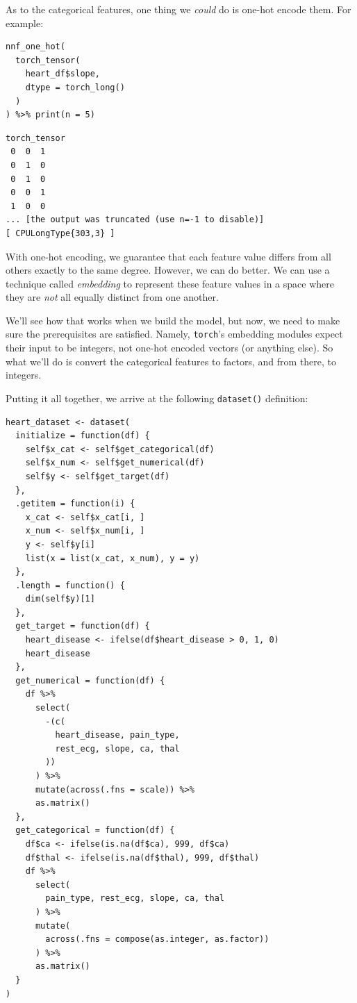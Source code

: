 \documentclass[
  letterpaper,
]{krantz}
\begin{document}
As to the categorical features, one thing we \emph{could} do is one-hot
encode them. For example:

\begin{verbatim}
nnf_one_hot(
  torch_tensor(
    heart_df$slope,
    dtype = torch_long()
  )
) %>% print(n = 5)
\end{verbatim}

\begin{verbatim}
torch_tensor
 0  0  1
 0  1  0
 0  1  0
 0  0  1
 1  0  0
... [the output was truncated (use n=-1 to disable)]
[ CPULongType{303,3} ]
\end{verbatim}

With one-hot encoding, we guarantee that each feature value differs from
all others exactly to the same degree. However, we can do better. We can
use a technique called \emph{embedding} to represent these feature
values in a space where they are \emph{not} all equally distinct from
one another.

We'll see how that works when we build the model, but now, we need to
make sure the prerequisites are satisfied. Namely, \texttt{torch}'s
embedding modules expect their input to be integers, not one-hot encoded
vectors (or anything else). So what we'll do is convert the categorical
features to factors, and from there, to integers.

Putting it all together, we arrive at the following \texttt{dataset()}
definition:

\begin{verbatim}
heart_dataset <- dataset(
  initialize = function(df) {
    self$x_cat <- self$get_categorical(df)
    self$x_num <- self$get_numerical(df)
    self$y <- self$get_target(df)
  },
  .getitem = function(i) {
    x_cat <- self$x_cat[i, ]
    x_num <- self$x_num[i, ]
    y <- self$y[i]
    list(x = list(x_cat, x_num), y = y)
  },
  .length = function() {
    dim(self$y)[1]
  },
  get_target = function(df) {
    heart_disease <- ifelse(df$heart_disease > 0, 1, 0)
    heart_disease
  },
  get_numerical = function(df) {
    df %>%
      select(
        -(c(
          heart_disease, pain_type,
          rest_ecg, slope, ca, thal
        ))
      ) %>%
      mutate(across(.fns = scale)) %>%
      as.matrix()
  },
  get_categorical = function(df) {
    df$ca <- ifelse(is.na(df$ca), 999, df$ca)
    df$thal <- ifelse(is.na(df$thal), 999, df$thal)
    df %>%
      select(
        pain_type, rest_ecg, slope, ca, thal
      ) %>%
      mutate(
        across(.fns = compose(as.integer, as.factor))
      ) %>%
      as.matrix()
  }
)
\end{verbatim}
\end{document}
